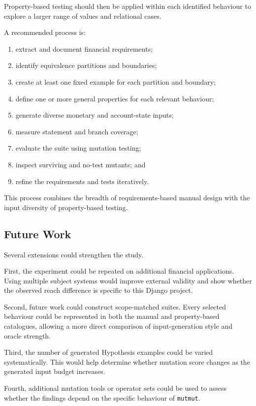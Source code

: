 \documentclass[12pt]{article}
\begin{document}
Property-based testing should then be applied within each identified behaviour
to explore a larger range of values and relational cases.

A recommended process is:

\begin{enumerate}
    \item extract and document financial requirements;
    \item identify equivalence partitions and boundaries;
    \item create at least one fixed example for each partition and boundary;
    \item define one or more general properties for each relevant behaviour;
    \item generate diverse monetary and account-state inputs;
    \item measure statement and branch coverage;
    \item evaluate the suite using mutation testing;
    \item inspect surviving and no-test mutants; and
    \item refine the requirements and tests iteratively.
\end{enumerate}

This process combines the breadth of requirements-based manual design with the
input diversity of property-based testing.

\subsection{Future Work}

Several extensions could strengthen the study.

First, the experiment could be repeated on additional financial applications.
Using multiple subject systems would improve external validity and show whether
the observed reach difference is specific to this Django project.

Second, future work could construct scope-matched suites. Every selected
behaviour could be represented in both the manual and property-based
catalogues, allowing a more direct comparison of input-generation style and
oracle strength.

Third, the number of generated Hypothesis examples could be varied
systematically. This would help determine whether mutation score changes as
the generated input budget increases.

Fourth, additional mutation tools or operator sets could be used to assess
whether the findings depend on the specific behaviour of \texttt{mutmut}.
\end{document}
